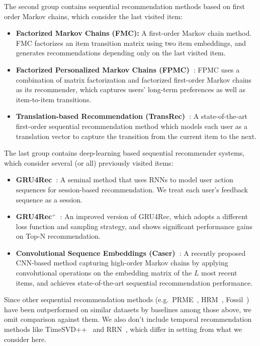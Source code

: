 \documentclass[conference]{IEEEtran}
\begin{document}
The second group contains sequential recommendation methods based on first order Markov chains, which consider the last visited item:
\begin{itemize}


\item\textbf{Factorized Markov Chains (FMC):} A first-order Markov chain method. FMC factorizes an item transition matrix using two item embeddings, and generates recommendations depending only on the last visited item.

\item\textbf{Factorized Personalized Markov Chains (FPMC)~\cite{rendle2010fpmc}}: FPMC uses a  combination of matrix factorization and factorized first-order Markov chains as its recommender, which captures users' long-term preferences as well as item-to-item transitions.

\item\textbf{Translation-based Recommendation (TransRec)~\cite{DBLP:conf/recsys/HeKM17}}: A state-of-the-art first-order sequential recommendation method which models each user as a translation vector to capture the transition from the current item to the next.
\end{itemize}

The last group contains deep-learning based sequential 
recommender systems,
which consider several (or all) previously visited items:

\begin{itemize}
\item\textbf{GRU4Rec~\cite{DBLP:journals/corr/HidasiKBT15}}: A seminal method 
that uses
RNNs to model user action sequences for session-based recommendation. We treat each user's feedback sequence as a session.

\item\textbf{GRU4Rec$^\text{+}$~\cite{DBLP:journals/corr/HidasiK17}}: An improved version of GRU4Rec, which adopts a different loss function and sampling strategy, and shows significant performance gains on Top-N recommendation.

\item\textbf{Convolutional Sequence Embeddings (Caser)~\cite{DBLP:conf/wsdm/TangW18}}: A recently proposed CNN-based method capturing high-order Markov chains by applying 
convolutional operations on the embedding matrix of the $L$ most recent items, and achieves state-of-the-art sequential recommendation performance.
\end{itemize}

Since other sequential recommendation methods (e.g.~PRME~\cite{feng2015prme}, HRM~\cite{hrm}, Fossil~\cite{DBLP:conf/icdm/HeM16}) have been outperformed on similar datasets by 
baselines among those above,
we omit 
comparison against them. We also don't include temporal recommendation methods like TimeSVD++~\cite{timeSVD} and RRN~\cite{DBLP:conf/wsdm/WuABSJ17}, 
which differ in setting from what we consider here.
\end{document}
